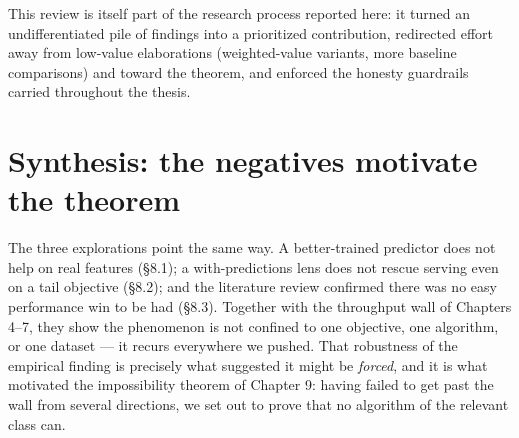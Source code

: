 This review is itself part of the research process reported here: it turned an
undifferentiated pile of findings into a prioritized contribution, redirected effort away
from low-value elaborations (weighted-value variants, more baseline comparisons) and toward
the theorem, and enforced the honesty guardrails carried throughout the thesis.

\section{Synthesis: the negatives motivate the theorem}\label{synthesis-the-negatives-motivate-the-theorem}

The three explorations point the same way. A better-trained predictor does not help on real
features (§8.1); a with-predictions lens does not rescue serving even on a tail objective
(§8.2); and the literature review confirmed there was no easy performance win to be had
(§8.3). Together with the throughput wall of Chapters 4--7, they show the phenomenon is not
confined to one objective, one algorithm, or one dataset --- it recurs everywhere we pushed.
That robustness of the empirical finding is precisely what suggested it might be \emph{forced},
and it is what motivated the impossibility theorem of Chapter 9: having failed to get past
the wall from several directions, we set out to prove that no algorithm of the relevant
class can.
